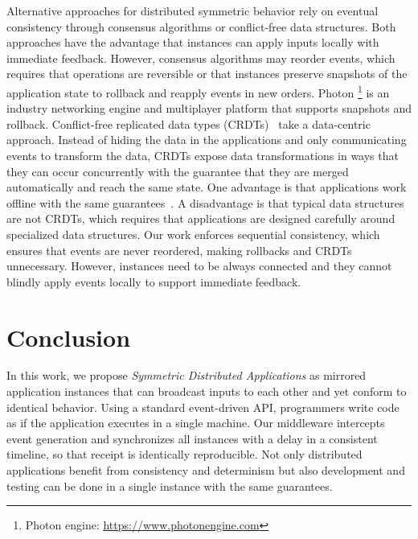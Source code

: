 \documentclass[sigplan,screen]{acmart}
\begin{document}
Alternative approaches for distributed symmetric behavior rely on eventual
consistency through consensus algorithms or conflict-free data structures.
Both approaches have the advantage that instances can apply inputs locally
with immediate feedback.
%
However, consensus algorithms may reorder events, which requires that
operations are reversible or that instances preserve snapshots of the
application state to rollback and reapply events in new orders.
Photon%
\footnote{Photon engine: \url{https://www.photonengine.com}}
is an industry networking engine and multiplayer platform that supports
snapshots and rollback.
%
Conflict-free replicated data types (CRDTs)~\cite{crdts} take a data-centric
approach.
Instead of hiding the data in the applications and only communicating events to
transform the data, CRDTs expose data transformations in ways that they can
occur concurrently with the guarantee that they are merged automatically and
reach the same state.
One advantage is that applications work offline with the same
guarantees~\cite{local}.
A disadvantage is that typical data structures are not CRDTs, which requires
that applications are designed carefully around specialized data structures.
%
Our work enforces sequential consistency, which ensures that events are never
reordered, making rollbacks and CRDTs unnecessary.
However, instances need to be always connected and they cannot blindly apply
events locally to support immediate feedback.

\section{Conclusion}
\label{sec.conclusion}

In this work, we propose \emph{Symmetric Distributed Applications} as mirrored
application instances that can broadcast inputs to each other and yet conform
to identical behavior.
%
Using a standard event-driven API, programmers write code as if the application
executes in a single machine.
Our middleware intercepts event generation and synchronizes all instances with
a delay in a consistent timeline, so that receipt is identically reproducible.
%
Not only distributed applications benefit from consistency and determinism but
also development and testing can be done in a single instance with the same
guarantees.
\end{document}
